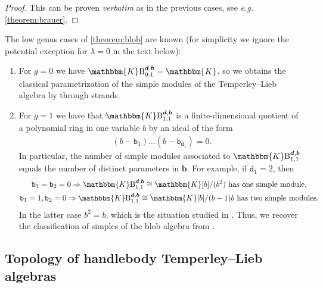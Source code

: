 \documentclass[a4paper,11pt]{amsart}
\newcommand{\eg}{\textsl{e.g.}}
\newcommand{\ver}{\textsl{verbatim}}
\renewcommand{\dots}{\text{...}}
\newcommand{\setstuff}[1]{\mathrm{#1}}
\newcommand{\KK}{\mathbbm{K}}
\newcommand{\bsym}[1]{\boldsymbol{#1}}
\newcommand{\varsym}[1]{\mathtt{#1}}
\newcommand{\bpar}{\bsym{b}}
\newcommand{\bvar}{\varsym{b}}
\newcommand{\dpar}{\bsym{d}}
\newcommand{\dvar}{\varsym{d}}
\numberwithin{equation}{section}
\let\fullref\autoref
\begin{document}
\begin{proof}
This can be proven {\ver} as in the previous cases, see {\eg} 
\fullref{theorem:brauer}.
\end{proof}

\begin{example}
The low genus cases of \fullref{theorem:blob} are known 
(for simplicity we ignore the potential exception 
for $\lambda=0$ in the text below):	

\begin{enumerate}

\item For $g=0$ we have $\KK\setstuff{B}_{0,1}^{\dpar,\bpar}=\KK$, so we obtains 
the classical parametrization of the simple modules of 
the Temperley--Lieb algebra by through strands.

\item For $g=1$ we have that $\KK\setstuff{B}_{1,1}^{\dpar,\bpar}$ is 
a finite-dimensional quotient of a polynomial ring in one variable $b$
by an ideal of the form
\begin{gather*}
(b-\bvar_{1})
\dots
(b-\bvar_{\dvar_{1}})=0.
\end{gather*} 
In particular, the number of simple modules associated to 
$\KK\setstuff{B}_{1,1}^{\dpar,\bpar}$ equals the number of distinct 
parameters in $\bpar$. For example, if $\dvar_{1}=2$, then
\begin{gather*}
\bvar_{1}=\bvar_{2}=0\Rightarrow
\KK\setstuff{B}_{1,1}^{\dpar,\bpar}\cong\KK[b]/(b^{2})
\text{ has one simple module},
\\
\bvar_{1}=1,\bvar_{2}=0\Rightarrow
\KK\setstuff{B}_{1,1}^{\dpar,\bpar}\cong\KK[b]/(b-1)b
\text{ has two simple modules}.
\end{gather*}
In the latter case $b^{2}=b$, 
which is the situation studied in \cite{MaSa-blob}.
Thus, we recover the classification of simples of the blob 
algebra from \cite{MaSa-blob}.
\end{enumerate}

\end{example}

\subsection{Topology of handlebody Temperley--Lieb algebras}\label{subsection:handlebody-tl-topology}
\end{document}
